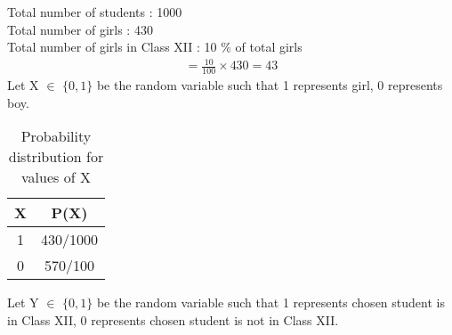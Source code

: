 Total number of students : 1000 \\
Total number of girls : 430  \\
Total number of girls in Class XII : 10 \% of total girls 
\begin{align}
=\frac{10}{100}\times 430 =43
\end{align}
Let X $\in$ $\{0,1\}$ be the random variable such that 1 represents girl, 0 represents boy.
\begin{table}[ht]
\caption{Probability distribution for values of X}
\label{2.12:table:0}
\begin{center}
\begin{tabular}{|c|c|}
    \hline
    X & P(X) \\
    \hline
    1 & 430/1000\\
    \hline
    0 & 570/100\\
    \hline
    \end{tabular} 
\end{center}   
\end{table}

Let Y $\in$ $\{0,1\}$ be the random variable such that 1 represents chosen student is in Class XII, 0 represents chosen student is not in Class XII.

